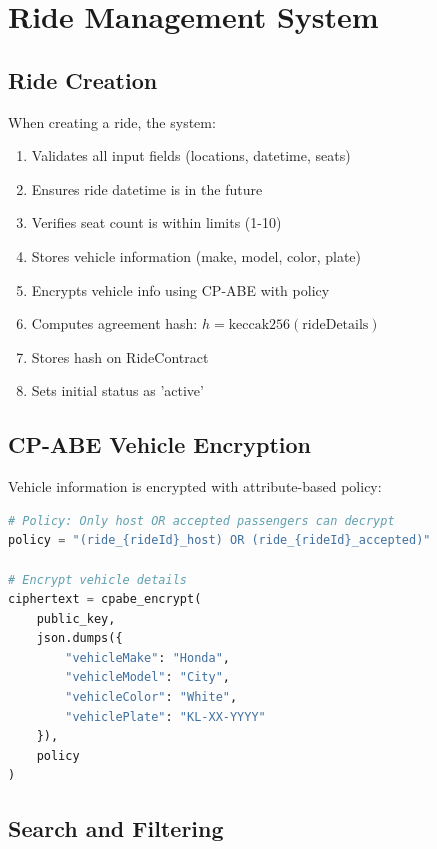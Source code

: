 \section{Ride Management System}

\subsection{Ride Creation}

When creating a ride, the system:

\begin{enumerate}
    \item Validates all input fields (locations, datetime, seats)
    \item Ensures ride datetime is in the future
    \item Verifies seat count is within limits (1-10)
    \item Stores vehicle information (make, model, color, plate)
    \item Encrypts vehicle info using CP-ABE with policy
    \item Computes agreement hash: $h = \text{keccak256}(\text{rideDetails})$
    \item Stores hash on RideContract
    \item Sets initial status as 'active'
\end{enumerate}

\subsection{CP-ABE Vehicle Encryption}

Vehicle information is encrypted with attribute-based policy:

\begin{lstlisting}[language=Python, caption=CP-ABE Encryption Policy]
# Policy: Only host OR accepted passengers can decrypt
policy = "(ride_{rideId}_host) OR (ride_{rideId}_accepted)"

# Encrypt vehicle details
ciphertext = cpabe_encrypt(
    public_key,
    json.dumps({
        "vehicleMake": "Honda",
        "vehicleModel": "City",
        "vehicleColor": "White",
        "vehiclePlate": "KL-XX-YYYY"
    }),
    policy
)
\end{lstlisting}

\subsection{Search and Filtering}

